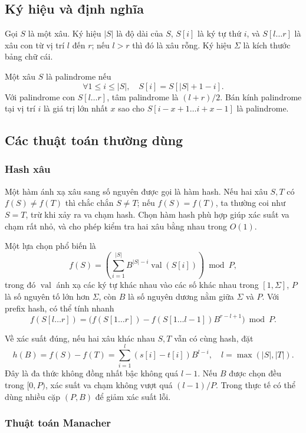 \documentclass[11pt]{article}
\begin{document}
\subsection{Ký hiệu và định nghĩa}

Gọi $S$ là một xâu. Ký hiệu $|S|$ là độ dài của $S$, $S[i]$ là ký tự thứ $i$,
và $S[l\ldots r]$ là xâu con từ vị trí $l$ đến $r$; nếu $l>r$ thì đó là xâu
rỗng. Ký hiệu $\Sigma$ là kích thước bảng chữ cái.

Một xâu $S$ là palindrome nếu
\[
  \forall 1\le i\le |S|,\quad S[i]=S[|S|+1-i].
\]
Với palindrome con $S[l\ldots r]$, tâm palindrome là $(l+r)/2$. Bán kính
palindrome tại vị trí $i$ là giá trị lớn nhất $x$ sao cho
$S[i-x+1\ldots i+x-1]$ là palindrome.

\subsection{Các thuật toán thường dùng}

\subsubsection{Hash xâu}

Một hàm ánh xạ xâu sang số nguyên được gọi là hàm hash. Nếu hai xâu $S,T$ có
$f(S)\ne f(T)$ thì chắc chắn $S\ne T$; nếu $f(S)=f(T)$, ta thường coi như
$S=T$, trừ khi xảy ra va chạm hash. Chọn hàm hash phù hợp giúp xác suất va chạm
rất nhỏ, và cho phép kiểm tra hai xâu bằng nhau trong $O(1)$.

Một lựa chọn phổ biến là
\[
  f(S)=\left(\sum_{i=1}^{|S|} B^{|S|-i}\operatorname{val}(S[i])\right)\bmod P,
\]
trong đó $\operatorname{val}$ ánh xạ các ký tự khác nhau vào các số khác nhau
trong $[1,\Sigma]$, $P$ là số nguyên tố lớn hơn $\Sigma$, còn $B$ là số nguyên
dương nằm giữa $\Sigma$ và $P$. Với prefix hash, có thể tính nhanh
\[
  f(S[l\ldots r])
  =
  \bigl(f(S[1\ldots r])-f(S[1\ldots l-1])B^{r-l+1}\bigr)\bmod P.
\]

Về xác suất đúng, nếu hai xâu khác nhau $S,T$ vẫn có cùng hash, đặt
\[
  h(B)=f(S)-f(T)=\sum_{i=1}^{l}(s[i]-t[i])B^{l-i},
  \quad l=\max(|S|,|T|).
\]
Đây là đa thức không đồng nhất bậc không quá $l-1$. Nếu $B$ được chọn đều trong
$[0,P)$, xác suất va chạm không vượt quá $(l-1)/P$. Trong thực tế có thể dùng
nhiều cặp $(P,B)$ để giảm xác suất lỗi.

\subsubsection{Thuật toán Manacher}
\end{document}
